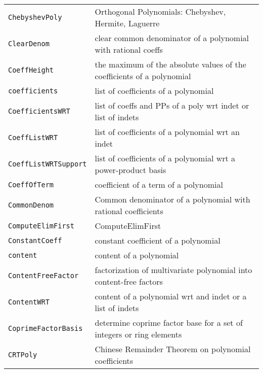 \documentclass[a4paper]{mybook}
\begin{document}
\begin{center}
\begin{longtable}{ll}
{\verb~ChebyshevPoly~} &
      Orthogonal Polynomials: Chebyshev, Hermite, Laguerre\\
   
{\verb~ClearDenom~} &
      clear common denominator of a polynomial with rational coeffs\\
   
{\verb~CoeffHeight~} &
      the maximum of the absolute values of the coefficients of a polynomial\\
   
{\verb~coefficients~} &
      list of coefficients of a polynomial\\
   
{\verb~CoefficientsWRT~} &
      list of coeffs and PPs of a poly wrt indet or list of indets\\
   
{\verb~CoeffListWRT~} &
      list of coefficients of a polynomial wrt an indet\\
   
{\verb~CoeffListWRTSupport~} &
      list of coefficients of a polynomial wrt a power-product basis\\
   
{\verb~CoeffOfTerm~} &
      coefficient of a term of a polynomial\\
   
{\verb~CommonDenom~} &
      Common denominator of a polynomial with rational coefficients\\
   
{\verb~ComputeElimFirst~} &
      ComputeElimFirst\\
   
{\verb~ConstantCoeff~} &
      constant coefficient of a polynomial\\
   
{\verb~content~} &
      content of a polynomial\\
   
{\verb~ContentFreeFactor~} &
      factorization of multivariate polynomial into content-free factors\\
   
{\verb~ContentWRT~} &
      content of a polynomial wrt and indet or a list of indets\\
   
{\verb~CoprimeFactorBasis~} &
      determine coprime factor base for a set of integers or ring elements\\
   
{\verb~CRTPoly~} &
      Chinese Remainder Theorem on polynomial coefficients\\
   

\end{longtable}
\end{center}
\end{document}
